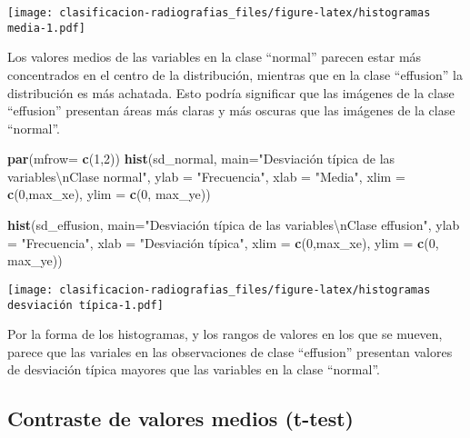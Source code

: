 \documentclass[]{article}
\newenvironment{Shaded}{\begin{snugshade}}{\end{snugshade}}
\newcommand{\KeywordTok}[1]{\textcolor[rgb]{0.13,0.29,0.53}{\textbf{#1}}}
\newcommand{\DataTypeTok}[1]{\textcolor[rgb]{0.13,0.29,0.53}{#1}}
\newcommand{\DecValTok}[1]{\textcolor[rgb]{0.00,0.00,0.81}{#1}}
\newcommand{\CharTok}[1]{\textcolor[rgb]{0.31,0.60,0.02}{#1}}
\newcommand{\StringTok}[1]{\textcolor[rgb]{0.31,0.60,0.02}{#1}}
\newcommand{\NormalTok}[1]{#1}
\begin{document}
\texttt{[image: clasificacion-radiografias\_files/figure-latex/histogramas media-1.pdf]}

Los valores medios de las variables en la clase ``normal'' parecen estar
más concentrados en el centro de la distribución, mientras que en la
clase ``effusion'' la distribución es más achatada. Esto podría
significar que las imágenes de la clase ``effusion'' presentan áreas más
claras y más oscuras que las imágenes de la clase ``normal''.

\begin{Shaded}
\begin{Highlighting}[]
\KeywordTok{par}\NormalTok{(}\DataTypeTok{mfrow=} \KeywordTok{c}\NormalTok{(}\DecValTok{1}\NormalTok{,}\DecValTok{2}\NormalTok{))}
\KeywordTok{hist}\NormalTok{(sd_normal,}
     \DataTypeTok{main=}\StringTok{"Desviación típica de las variables}\CharTok{\textbackslash{}n}\StringTok{Clase normal"}\NormalTok{,}
     \DataTypeTok{ylab =} \StringTok{"Frecuencia"}\NormalTok{,}
     \DataTypeTok{xlab =} \StringTok{"Media"}\NormalTok{,}
     \DataTypeTok{xlim =} \KeywordTok{c}\NormalTok{(}\DecValTok{0}\NormalTok{,max_xe),}
     \DataTypeTok{ylim =} \KeywordTok{c}\NormalTok{(}\DecValTok{0}\NormalTok{, max_ye))}

\KeywordTok{hist}\NormalTok{(sd_effusion,}
     \DataTypeTok{main=}\StringTok{"Desviación típica de las variables}\CharTok{\textbackslash{}n}\StringTok{Clase effusion"}\NormalTok{,}
     \DataTypeTok{ylab =} \StringTok{"Frecuencia"}\NormalTok{,}
     \DataTypeTok{xlab =} \StringTok{"Desviación típica"}\NormalTok{,}
     \DataTypeTok{xlim =} \KeywordTok{c}\NormalTok{(}\DecValTok{0}\NormalTok{,max_xe),}
     \DataTypeTok{ylim =} \KeywordTok{c}\NormalTok{(}\DecValTok{0}\NormalTok{, max_ye))}
\end{Highlighting}
\end{Shaded}

\texttt{[image: clasificacion-radiografias\_files/figure-latex/histogramas desviación típica-1.pdf]}

Por la forma de los histogramas, y los rangos de valores en los que se
mueven, parece que las variales en las observaciones de clase
``effusion'' presentan valores de desviación típica mayores que las
variables en la clase ``normal''.

\subsection{Contraste de valores medios
(t-test)}\label{contraste-de-valores-medios-t-test}
\end{document}
